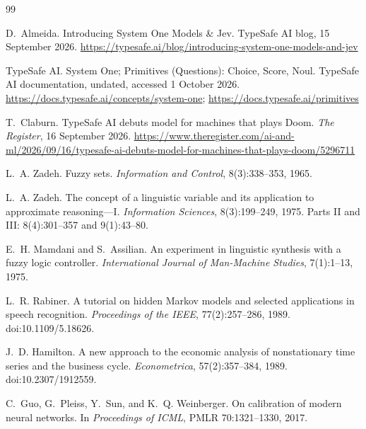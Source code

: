 \documentclass[11pt,a4paper]{article}
\numberwithin{equation}{section}
\theoremstyle{plain}
\theoremstyle{definition}
\theoremstyle{remark}
\begin{document}

\begin{thebibliography}{99}

D.~Almeida.
\newblock Introducing System One Models \& Jev.
\newblock TypeSafe AI blog, 15 September 2026.
\newblock \url{https://typesafe.ai/blog/introducing-system-one-models-and-jev}

TypeSafe AI.
\newblock System One; Primitives (Questions): Choice, Score, Noul.
\newblock TypeSafe AI documentation, undated, accessed 1 October 2026.
\newblock \url{https://docs.typesafe.ai/concepts/system-one}; \url{https://docs.typesafe.ai/primitives}

T.~Claburn.
\newblock TypeSafe AI debuts model for machines that plays Doom.
\newblock \emph{The Register}, 16 September 2026.
\newblock \url{https://www.theregister.com/ai-and-ml/2026/09/16/typesafe-ai-debuts-model-for-machines-that-plays-doom/5296711}

L.~A. Zadeh.
\newblock Fuzzy sets.
\newblock \emph{Information and Control}, 8(3):338--353, 1965.

L.~A. Zadeh.
\newblock The concept of a linguistic variable and its application to approximate reasoning---I.
\newblock \emph{Information Sciences}, 8(3):199--249, 1975. Parts II and III: 8(4):301--357 and 9(1):43--80.

E.~H. Mamdani and S.~Assilian.
\newblock An experiment in linguistic synthesis with a fuzzy logic controller.
\newblock \emph{International Journal of Man-Machine Studies}, 7(1):1--13, 1975.

L.~R. Rabiner.
\newblock A tutorial on hidden Markov models and selected applications in speech recognition.
\newblock \emph{Proceedings of the IEEE}, 77(2):257--286, 1989. doi:10.1109/5.18626.

J.~D. Hamilton.
\newblock A new approach to the economic analysis of nonstationary time series and the business cycle.
\newblock \emph{Econometrica}, 57(2):357--384, 1989. doi:10.2307/1912559.

C.~Guo, G.~Pleiss, Y.~Sun, and K.~Q. Weinberger.
\newblock On calibration of modern neural networks.
\newblock In \emph{Proceedings of ICML}, PMLR 70:1321--1330, 2017.


\end{thebibliography}
\end{document}
